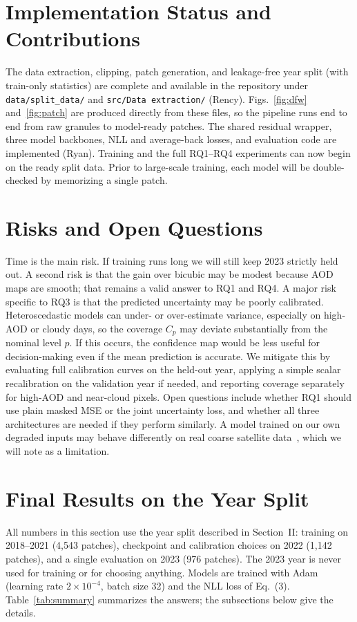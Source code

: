 \documentclass[conference]{IEEEtran}
\begin{document}
\section{Implementation Status and Contributions}
The data extraction, clipping, patch generation, and leakage-free year split (with train-only statistics) are complete and available in the repository under \texttt{data/split\_data/} and \texttt{src/Data extraction/} (Rency). Figs.~\ref{fig:dfw} and~\ref{fig:patch} are produced directly from these files, so the pipeline runs end to end from raw granules to model-ready patches. The shared residual wrapper, three model backbones, NLL and average-back losses, and evaluation code are implemented (Ryan). Training and the full RQ1--RQ4 experiments can now begin on the ready split data. Prior to large-scale training, each model will be double-checked by memorizing a single patch.
\section{Risks and Open Questions}
Time is the main risk. If training runs long we will still keep 2023 strictly held out. A second risk is that the gain over bicubic may be modest because AOD maps are smooth; that remains a valid answer to RQ1 and RQ4. 
A major risk specific to RQ3 is that the predicted uncertainty may be poorly calibrated. Heteroscedastic models can under- or over-estimate variance, especially on high-AOD or cloudy days, so the coverage \(C_p\) may deviate substantially from the nominal level \(p\). If this occurs, the confidence map would be less useful for decision-making even if the mean prediction is accurate. We mitigate this by evaluating full calibration curves on the held-out year, applying a simple scalar recalibration on the validation year if needed, and reporting coverage separately for high-AOD and near-cloud pixels.
Open questions include whether RQ1 should use plain masked MSE or the joint uncertainty loss, and whether all three architectures are needed if they perform similarly. A model trained on our own degraded inputs may behave differently on real coarse satellite data~\cite{aybar2026sen2sr}, which we will note as a limitation.

\section{Final Results on the Year Split}
All numbers in this section use the year split described in Section~II: training on 2018--2021 (4{,}543 patches), checkpoint and calibration choices on 2022 (1{,}142 patches), and a single evaluation on 2023 (976 patches). The 2023 year is never used for training or for choosing anything. Models are trained with Adam (learning rate \(2\times10^{-4}\), batch size 32) and the NLL loss of Eq.~(3). Table~\ref{tab:summary} summarizes the answers; the subsections below give the details.
\end{document}
